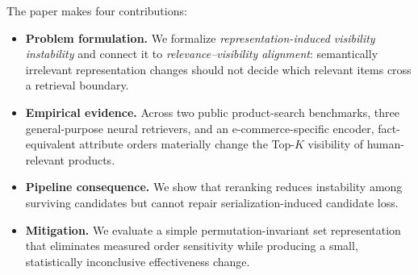 The paper makes four contributions:
\begin{itemize}
  \item \textbf{Problem formulation.} We formalize \emph{representation-induced visibility instability} and connect it to \emph{relevance--visibility alignment}: semantically irrelevant representation changes should not decide which relevant items cross a retrieval boundary.
  \item \textbf{Empirical evidence.} Across two public product-search benchmarks, three general-purpose neural retrievers, and an e-commerce-specific encoder, fact-equivalent attribute orders materially change the Top-$K$ visibility of human-relevant products.
  \item \textbf{Pipeline consequence.} We show that reranking reduces instability among surviving candidates but cannot repair serialization-induced candidate loss.
  \item \textbf{Mitigation.} We evaluate a simple permutation-invariant set representation that eliminates measured order sensitivity while producing a small, statistically inconclusive effectiveness change.
\end{itemize}
